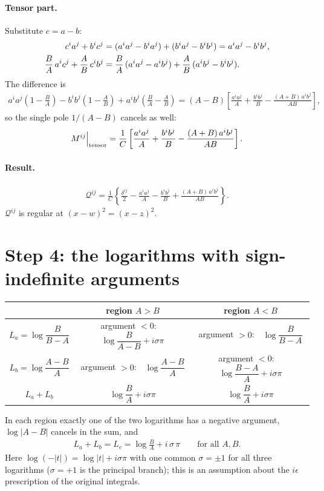 \documentclass[10pt]{article}
\numberwithin{equation}{section}
\begin{document}
\paragraph{Tensor part.} Substitute $c=a-b$:
\begin{align}
c^{i}a^{j}+b^{i}c^{j}&=(a^{i}a^{j}-b^{i}a^{j})+(b^{i}a^{j}-b^{i}b^{j})=a^{i}a^{j}-b^{i}b^{j},\notag\\
\frac{B}{A}\,a^{i}c^{j}+\frac{A}{B}\,c^{i}b^{j}&=\frac{B}{A}\,(a^{i}a^{j}-a^{i}b^{j})+\frac{A}{B}\,(a^{i}b^{j}-b^{i}b^{j}).
\end{align}
The difference is
\begin{align}
a^{i}a^{j}\left(1-\frac{B}{A}\right)-b^{i}b^{j}\left(1-\frac{A}{B}\right)+a^{i}b^{j}\left(\frac{B}{A}-\frac{A}{B}\right)
=(A-B)\left[\frac{a^{i}a^{j}}{A}+\frac{b^{i}b^{j}}{B}-\frac{(A+B)\,a^{i}b^{j}}{AB}\right],
\end{align}
so the single pole $1/(A-B)$ cancels as well:
\begin{align}
M^{ij}\Big|_{\rm tensor}=\frac{1}{C}\left[\frac{a^{i}a^{j}}{A}+\frac{b^{i}b^{j}}{B}-\frac{(A+B)\,a^{i}b^{j}}{AB}\right].
\end{align}

\paragraph{Result.}
\begin{align}
\mathcal{Q}^{ij}=\frac{1}{C}\left\{\frac{\delta^{ij}}{2}-\frac{a^{i}a^{j}}{A}-\frac{b^{i}b^{j}}{B}+\frac{(A+B)\,a^{i}b^{j}}{AB}\right\}. \label{eq:Q}
\end{align}
$\mathcal{Q}^{ij}$ is regular at $(x-w)^{2}=(x-z)^{2}$.

\section{Step 4: the logarithms with sign-indefinite arguments}

\begin{center}
\renewcommand{\arraystretch}{1.4}
\begin{tabular}{c|c|c}
 & region $A>B$ & region $A<B$\\ \hline
$L_{a}=\log\dfrac{B}{B-A}$ & argument $<0$:\ \ $\log\dfrac{B}{A-B}+i\sigma\pi$ & argument $>0$:\ \ $\log\dfrac{B}{B-A}$\\
$L_{b}=\log\dfrac{A-B}{A}$ & argument $>0$:\ \ $\log\dfrac{A-B}{A}$ & argument $<0$:\ \ $\log\dfrac{B-A}{A}+i\sigma\pi$\\ \hline
$L_{a}+L_{b}$ & $\log\dfrac{B}{A}+i\sigma\pi$ & $\log\dfrac{B}{A}+i\sigma\pi$
\end{tabular}
\end{center}
In each region exactly one of the two logarithms has a negative argument, $\log|A-B|$ cancels in the sum, and
\begin{align}
L_{a}+L_{b}=L_{c}=\log\frac{B}{A}+i\,\sigma\,\pi\qquad\text{for all }A,B. \label{eq:logsum}
\end{align}
Here $\log(-|t|)=\log|t|+i\sigma\pi$ with one common $\sigma=\pm1$ for all three logarithms ($\sigma=+1$ is the principal branch); this is an assumption about the $i\epsilon$ prescription of the original integrals.
\end{document}

